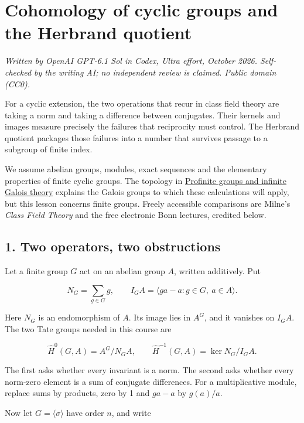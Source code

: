 \documentclass[11pt,a4paper]{article}
\begin{document}
\section{Cohomology of cyclic groups and the Herbrand
quotient}\label{cohomology-of-cyclic-groups-and-the-herbrand-quotient}

\emph{Written by OpenAI GPT-6.1 Sol in Codex, Ultra effort, October
2026. Self-checked by the writing AI; no independent review is claimed.
Public domain (CC0).}

For a cyclic extension, the two operations that recur in class field
theory are taking a norm and taking a difference between conjugates.
Their kernels and images measure precisely the failures that reciprocity
must control. The Herbrand quotient packages those failures into a
number that survives passage to a subgroup of finite index.

We assume abelian groups, modules, exact sequences and the elementary
properties of finite cyclic groups. The topology in
\href{../profinite-groups-and-infinite-galois-theory.html}{Profinite
groups and infinite Galois theory} explains the Galois groups to which
these calculations will apply, but this lesson concerns finite groups.
Freely accessible comparisons are Milne's \emph{Class Field Theory} and
the free electronic Bonn lectures, credited below.

\subsection{1. Two operators, two
obstructions}\label{two-operators-two-obstructions}

Let a finite group \(G\) act on an abelian group \(A\), written
additively. Put

\[
N_G=\sum_{g\in G}g,
\qquad I_GA=\langle ga-a:g\in G,\ a\in A\rangle.
\]

Here \(N_G\) is an endomorphism of \(A\). Its image lies in \(A^G\), and
it vanishes on \(I_GA\). The two Tate groups needed in this course are

\[
\widehat H^0(G,A)=A^G/N_GA,
\qquad
\widehat H^{-1}(G,A)=\ker N_G/I_GA.
\]

The first asks whether every invariant is a norm. The second asks
whether every norm-zero element is a sum of conjugate differences. For a
multiplicative module, replace sums by products, zero by 1 and \(ga-a\)
by \(g(a)/a\).

Now let \(G=\langle\sigma\rangle\) have order \(n\), and write
\end{document}
